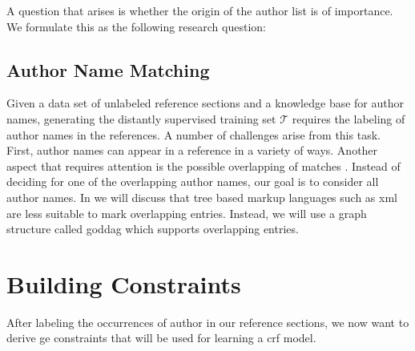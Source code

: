 \bigskip

A question that arises is whether the origin of the author list is of importance.
We formulate this as the following research question:
\researchquestionone%

\subsection{Author Name Matching}\label{subsec:ae-author-name-matching}

Given a data set of unlabeled reference sections and a knowledge base for author names, generating the distantly supervised training set $\mathcal{T}$ requires the labeling of author names in the references.
A number of challenges arise from this task.
First, author names can appear in a reference in a variety of ways.
Another aspect that requires attention is the possible overlapping of matches .
Instead of deciding for one of the overlapping author names, our goal is to consider all author names.
In  we will discuss that tree based markup languages such as \gls{xml} are less suitable to mark overlapping entries.
Instead, we will use a graph structure called \gls{goddag} which supports overlapping entries.

\section{Building  Constraints}\label{sec:ae-training-crfs}

After labeling the occurrences of author in our reference sections, we now want to derive \gls{ge} constraints that will be used for learning a \gls{crf} model.

